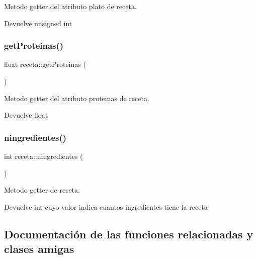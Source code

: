 Metodo getter del atributo plato de receta. 

\begin{DoxyReturn}{Devuelve}
unsigned int 
\end{DoxyReturn}
\mbox{\label{classreceta_a801a77ecf009073fd84aae1b0b3dac36}} 
\subsubsection{\texorpdfstring{get\+Proteinas()}{getProteinas()}}
{\footnotesize\ttfamily float receta\+::get\+Proteinas (\begin{DoxyParamCaption}{ }\end{DoxyParamCaption})}



Metodo getter del atributo proteinas de receta. 

\begin{DoxyReturn}{Devuelve}
float 
\end{DoxyReturn}
\mbox{\label{classreceta_a7ab9669bb735e19cdfa1b2fce720bd21}} 
\subsubsection{\texorpdfstring{ningredientes()}{ningredientes()}}
{\footnotesize\ttfamily int receta\+::ningredientes (\begin{DoxyParamCaption}{ }\end{DoxyParamCaption})}



Metodo getter de receta. 

\begin{DoxyReturn}{Devuelve}
int cuyo valor indica cuantos ingredientes tiene la receta 
\end{DoxyReturn}


\subsection{Documentación de las funciones relacionadas y clases amigas}
\mbox{\label{classreceta_a93def1190ead1b91d310359d61f831ff}} 
